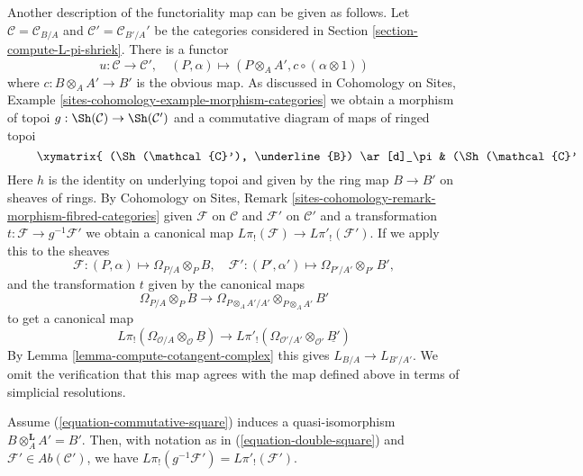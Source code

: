 \medskip\noindent
Another description of the functoriality map can be given as follows.
Let $\mathcal{C} = \mathcal{C}_{B/A}$ and $\mathcal{C}' = \mathcal{C}_{B'/A}'$
be the categories considered in Section \ref{section-compute-L-pi-shriek}.
There is a functor
$$
u : \mathcal{C} \longrightarrow \mathcal{C}',\quad
(P, \alpha) \longmapsto (P \otimes_A A', c \circ (\alpha \otimes 1))
$$
where $c : B \otimes_A A' \to B'$ is the obvious map. As discussed in
Cohomology on Sites, Example
\ref{sites-cohomology-example-morphism-categories}
we obtain a morphism of topoi $g : \Sh(\mathcal{C}) \to \Sh(\mathcal{C}')$
and a commutative diagram of maps of ringed topoi
\begin{equation}
\label{equation-double-square}
\vcenter{
\xymatrix{
(\Sh(\mathcal{C}'), \underline{B}) \ar[d]_\pi &
(\Sh(\mathcal{C}'), \underline{B'}) \ar[d]_\pi \ar[l]^h &
(\Sh(\mathcal{C}), \underline{B'}) \ar[d]_{\pi'} \ar[l]^g \\
(\Sh(*), B) &
(\Sh(*), B') \ar[l]_f &
(\Sh(*), B') \ar[l]
}
}
\end{equation}
Here $h$ is the identity on underlying topoi and given by the ring map
$B \to B'$ on sheaves of rings. 
By Cohomology on Sites, Remark
\ref{sites-cohomology-remark-morphism-fibred-categories}
given $\mathcal{F}$ on $\mathcal{C}$ and $\mathcal{F}'$ on $\mathcal{C}'$
and a transformation $t : \mathcal{F} \to g^{-1}\mathcal{F}'$
we obtain a canonical map $L\pi_!(\mathcal{F}) \to L\pi'_!(\mathcal{F}')$.
If we apply this to the sheaves
$$
\mathcal{F} : (P, \alpha) \mapsto \Omega_{P/A} \otimes_P B,\quad
\mathcal{F}' : (P', \alpha') \mapsto \Omega_{P'/A'} \otimes_{P'} B',
$$
and the transformation $t$ given by the canonical maps
$$
\Omega_{P/A} \otimes_P B \longrightarrow
\Omega_{P \otimes_A A'/A'} \otimes_{P \otimes_A A'} B'
$$
to get a canonical map
$$
L\pi_!(\Omega_{\mathcal{O}/A} \otimes_\mathcal{O} \underline{B})
\longrightarrow
L\pi'_!(\Omega_{\mathcal{O}'/A'} \otimes_{\mathcal{O}'} \underline{B'})
$$
By Lemma \ref{lemma-compute-cotangent-complex} this gives
$L_{B/A} \to L_{B'/A'}$. We omit the verification that this map
agrees with the map defined above in terms of simplicial
resolutions.

\begin{lemma}
\label{lemma-flat-base-change}
Assume (\ref{equation-commutative-square}) induces a quasi-isomorphism
$B \otimes_A^\mathbf{L} A' = B'$. Then, with notation as in
(\ref{equation-double-square}) and
$\mathcal{F}' \in \textit{Ab}(\mathcal{C}')$,
we have $L\pi_!(g^{-1}\mathcal{F}') = L\pi'_!(\mathcal{F}')$.
\end{lemma}

